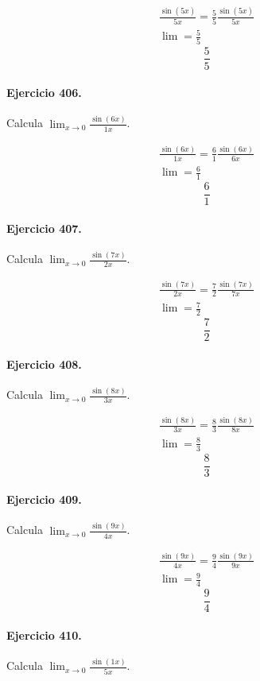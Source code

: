 \documentclass[11pt,a4paper]{article}
\begin{document}
\[
\begin{aligned}
\frac{\sin(5x)}{5x}=\frac{5}{5}\frac{\sin(5x)}{5x}\\
\lim=\frac{5}{5}
\end{aligned}
\]
\[\boxed{\frac{5}{5}}\]


\paragraph{Ejercicio 406.} Calcula $\displaystyle\lim_{x\to0}\frac{\sin(6x)}{1x}$.

\[
\begin{aligned}
\frac{\sin(6x)}{1x}=\frac{6}{1}\frac{\sin(6x)}{6x}\\
\lim=\frac{6}{1}
\end{aligned}
\]
\[\boxed{\frac{6}{1}}\]


\paragraph{Ejercicio 407.} Calcula $\displaystyle\lim_{x\to0}\frac{\sin(7x)}{2x}$.

\[
\begin{aligned}
\frac{\sin(7x)}{2x}=\frac{7}{2}\frac{\sin(7x)}{7x}\\
\lim=\frac{7}{2}
\end{aligned}
\]
\[\boxed{\frac{7}{2}}\]


\paragraph{Ejercicio 408.} Calcula $\displaystyle\lim_{x\to0}\frac{\sin(8x)}{3x}$.

\[
\begin{aligned}
\frac{\sin(8x)}{3x}=\frac{8}{3}\frac{\sin(8x)}{8x}\\
\lim=\frac{8}{3}
\end{aligned}
\]
\[\boxed{\frac{8}{3}}\]


\paragraph{Ejercicio 409.} Calcula $\displaystyle\lim_{x\to0}\frac{\sin(9x)}{4x}$.

\[
\begin{aligned}
\frac{\sin(9x)}{4x}=\frac{9}{4}\frac{\sin(9x)}{9x}\\
\lim=\frac{9}{4}
\end{aligned}
\]
\[\boxed{\frac{9}{4}}\]


\paragraph{Ejercicio 410.} Calcula $\displaystyle\lim_{x\to0}\frac{\sin(1x)}{5x}$.
\end{document}

